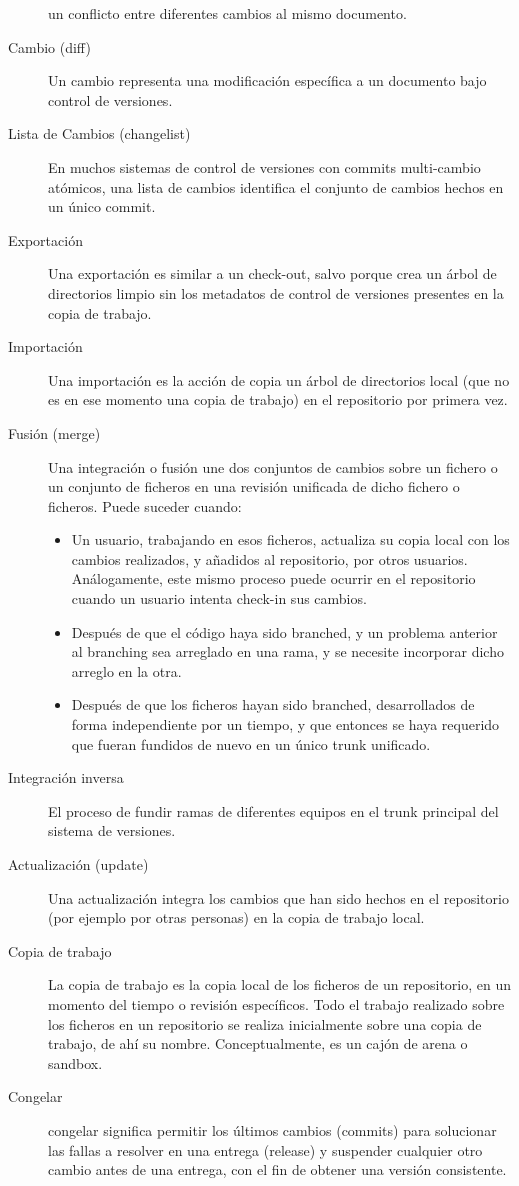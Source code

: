\begin{description}
  un conflicto entre diferentes cambios al mismo documento. 
\item [Cambio (diff)] Un cambio representa una modificación específica
  a un documento bajo control de versiones. 
\item [Lista de Cambios (changelist)] En muchos sistemas de control de
  versiones con commits multi-cambio atómicos, una lista de cambios
  identifica el conjunto de cambios hechos en un único commit. 
\item [Exportación] Una exportación es similar a un check-out, salvo
  porque crea un árbol de directorios limpio sin los metadatos de
  control de versiones presentes en la copia de trabajo. 
\item [Importación] Una importación es la acción de copia un árbol de
  directorios local (que no es en ese momento una copia de trabajo) en
  el repositorio por primera vez.
\item [Fusión (merge)] Una integración o fusión une dos conjuntos de
  cambios sobre un fichero o un conjunto de ficheros en una revisión
  unificada de dicho fichero o ficheros. Puede suceder cuando: 
\begin{itemize}
\item Un usuario, trabajando en esos ficheros, actualiza su copia
  local con los cambios realizados, y añadidos al repositorio, por
  otros usuarios. Análogamente, este mismo proceso puede ocurrir en el
  repositorio cuando un usuario intenta check-in sus cambios. 
\item Después de que el código haya sido branched, y un problema
  anterior al branching sea arreglado en una rama, y se necesite
  incorporar dicho arreglo en la otra. 
\item Después de que los ficheros hayan sido branched, desarrollados
  de forma independiente por un tiempo, y que entonces se haya
  requerido que fueran fundidos de nuevo en un único trunk unificado. 
\end{itemize}
\item [Integración inversa] El proceso de fundir ramas de diferentes
  equipos en el trunk principal del sistema de versiones. 
\item [Actualización (update)] Una actualización integra los cambios
  que han sido hechos en el repositorio (por ejemplo por otras
  personas) en la copia de trabajo local. 
\item [Copia de trabajo] La copia de trabajo es la copia local de los
  ficheros de un repositorio, en un momento del tiempo o revisión
  específicos. Todo el trabajo realizado sobre los ficheros en un
  repositorio se realiza inicialmente sobre una copia de trabajo, de
  ahí su nombre. Conceptualmente, es un cajón de arena o sandbox. 
\item [Congelar] congelar significa permitir los últimos cambios
  (commits) para solucionar las fallas a resolver en una entrega
  (release) y suspender cualquier otro cambio antes de una entrega,
  con el fin de obtener una versión consistente. 
\end{description}

